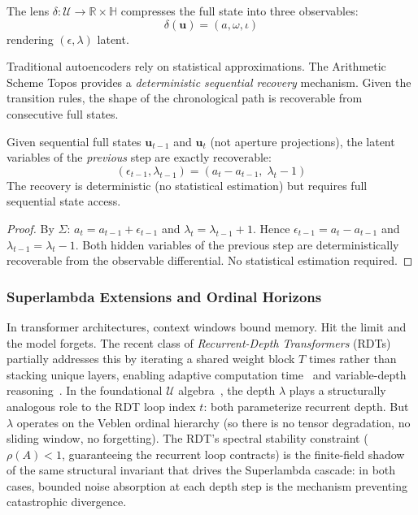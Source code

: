 \begin{definition}
The lens $\delta : \mathcal{U} \to \mathbb{R} \times \mathbb{H}$ compresses the full state into three observables:
$$\delta(\mathbf{u}) = (a, \omega, \iota)$$
rendering $({\epsilon, \lambda})$ latent.
\end{definition}

Traditional autoencoders rely on statistical approximations. The Arithmetic Scheme Topos provides a \emph{deterministic sequential recovery} mechanism. Given the transition rules, the shape of the chronological path is recoverable from consecutive full states.

\begin{theorem}
Given sequential full states $\mathbf{u}_{t-1}$ and $\mathbf{u}_t$ (not aperture projections), the latent variables of the \emph{previous} step are exactly recoverable:
$$(\epsilon_{t-1}, \lambda_{t-1}) = (a_t - a_{t-1},\; \lambda_t - 1)$$
The recovery is deterministic (no statistical estimation) but requires full sequential state access.
\end{theorem}

\begin{proof}
By $\Sigma$: $a_t = a_{t-1} + \epsilon_{t-1}$ and $\lambda_t = \lambda_{t-1} + 1$. Hence $\epsilon_{t-1} = a_t - a_{t-1}$ and $\lambda_{t-1} = \lambda_t - 1$. Both hidden variables of the previous step are deterministically recoverable from the observable differential. No statistical estimation required. \qedhere
\end{proof}

\subsubsection{Superlambda Extensions and Ordinal Horizons}

In transformer architectures, context windows bound memory. Hit the limit and the model forgets. The recent class of \emph{Recurrent-Depth Transformers} (RDTs) partially addresses this by iterating a shared weight block $T$ times rather than stacking unique layers, enabling adaptive computation time~\cite{Graves2016ACT} and variable-depth reasoning~\cite{Dehghani2019UT,Bae2024RRT}. In the foundational $\mathcal{U}$ algebra~\cite{larue_lc}, the depth $\lambda$ plays a structurally analogous role to the RDT loop index $t$: both parameterize recurrent depth. But $\lambda$ operates on the Veblen ordinal hierarchy (so there is no tensor degradation, no sliding window, no forgetting). The RDT's spectral stability constraint ($\rho(A) < 1$, guaranteeing the recurrent loop contracts) is the finite-field shadow of the same structural invariant that drives the Superlambda cascade: in both cases, bounded noise absorption at each depth step is the mechanism preventing catastrophic divergence.


